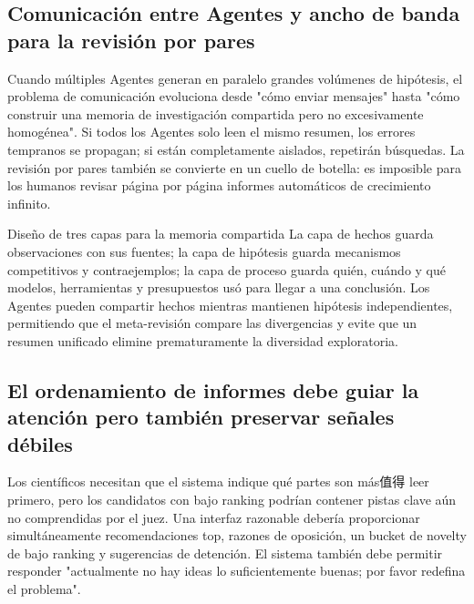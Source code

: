 \subsection{Comunicación entre Agentes y ancho de banda para la revisión por pares}

Cuando múltiples Agentes generan en paralelo grandes volúmenes de hipótesis, el problema de comunicación evoluciona desde "cómo enviar mensajes" hasta "cómo construir una memoria de investigación compartida pero no excesivamente homogénea". Si todos los Agentes solo leen el mismo resumen, los errores tempranos se propagan; si están completamente aislados, repetirán búsquedas. La revisión por pares también se convierte en un cuello de botella: es imposible para los humanos revisar página por página informes automáticos de crecimiento infinito.

\begin{knowledgebox}{Diseño de tres capas para la memoria compartida}
La capa de hechos guarda observaciones con sus fuentes; la capa de hipótesis guarda mecanismos competitivos y contraejemplos; la capa de proceso guarda quién, cuándo y qué modelos, herramientas y presupuestos usó para llegar a una conclusión. Los Agentes pueden compartir hechos mientras mantienen hipótesis independientes, permitiendo que el meta-revisión compare las divergencias y evite que un resumen unificado elimine prematuramente la diversidad exploratoria.
\end{knowledgebox}


\subsection{El ordenamiento de informes debe guiar la atención pero también preservar señales débiles}

Los científicos necesitan que el sistema indique qué partes son más值得 leer primero, pero los candidatos con bajo ranking podrían contener pistas clave aún no comprendidas por el juez. Una interfaz razonable debería proporcionar simultáneamente recomendaciones top, razones de oposición, un bucket de novelty de bajo ranking y sugerencias de detención. El sistema también debe permitir responder "actualmente no hay ideas lo suficientemente buenas; por favor redefina el problema".

